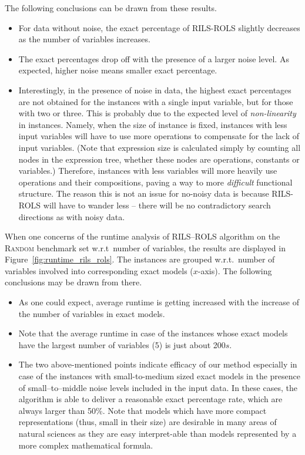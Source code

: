 \documentclass{bmcart}
\begin{document}
The following conclusions can be drawn from these results.

\begin{itemize}
	\item For data without noise, the exact percentage of \textsc{RILS}-\textsc{ROLS} slightly decreases as the  number of variables increases. 
	\item The exact percentages drop off with the presence of a larger noise level. As expected, higher noise means smaller exact percentage.
	\item Interestingly, in the presence of noise in data, the highest exact percentages are not obtained for the instances with a single input variable, but for those with two or three. This is probably due to the expected level of \emph{non-linearity} in instances. Namely, when the size of instance is fixed, instances with less input variables will have to use more operations to compensate for the lack of input variables. (Note that expression size is calculated simply by counting all nodes in the expression tree, whether these nodes are operations, constants or variables.) Therefore, instances with less variables will more heavily use operations and their compositions, paving a way to more \emph{difficult} functional structure. 
	The reason this is not an issue for no-noisy data is because \textsc{RILS-ROLS} will have to wander less -- there will be no contradictory search directions as with noisy data.
\end{itemize}


When one concerns of the runtime analysis of \textsc{RILS}--\textsc{ROLS} algorithm on the \textsc{Random} benchmark set w.r.t\ number of variables, the results are displayed in Figure~\ref{fig:runtime_rils_rols}. The instances are grouped w.r.t.\ number of variables involved into corresponding exact models ($x$-axis). The following conclusions may be drawn from there.  

\begin{itemize}
	\item As one could expect, average runtime is getting increased with the increase of the number of variables in exact models. 
	\item Note that the average runtime in case of the instances whose exact models have the largest number of variables (5) is just about 200$s$.
	\item The two above-mentioned points indicate efficacy of our method especially in case of the instances with small-to-medium sized exact models in the presence of small--to--middle noise levels included in the input data. In these cases, the algorithm is able to deliver a reasonable exact percentage rate, which are always larger than 50\%. Note that models which have more compact representations (thus, small in their size) are desirable in many areas of natural sciences as they are easy interpret-able than models represented by a more complex mathematical formula.   
\end{itemize}
\end{document}
